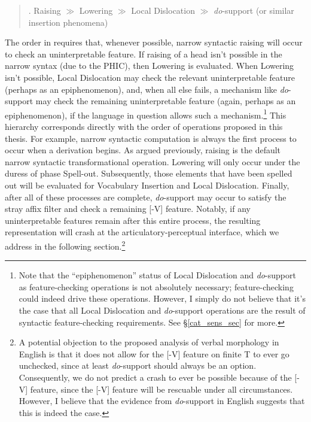 \singlespacing
\begin{quote}
\ex. Raising $\gg$ Lowering $\gg$ Local Dislocation $\gg$ {\it do}-support (or similar insertion phenomena)

\end{quote}
\onehalfspacing
The order in \Last requires that, whenever possible, narrow syntactic raising will occur to check an uninterpretable feature. If raising of a head isn't possible in the narrow syntax (due to the PHIC), then Lowering is evaluated. When Lowering isn't possible, Local Dislocation may check the relevant uninterpretable feature (perhaps as an epiphenomenon), and, when all else fails, a mechanism like {\it do}-support may check the remaining uninterpretable feature (again, perhaps as an epiphenomenon), if the language in question allows such a mechanism.\footnote{Note that the ``epiphenomenon'' status of Local Dislocation and {\it do}-support as feature-checking operations is not absolutely necessary; feature-checking could indeed drive these operations. However, I simply do not believe that it's the case that all Local Dislocation and {\it do}-support operations are the result of syntactic feature-checking requirements. See \S\ref{cat_sens_sec} for more.} This hierarchy corresponds directly with the order of operations proposed in this thesis. For example, narrow syntactic computation is always the first process to occur when a derivation begins. As argued previously, raising is the default narrow syntactic transformational operation. Lowering will only occur under the duress of phase Spell-out. Subsequently, those elements that have been spelled out will be evaluated for Vocabulary Insertion and Local Dislocation. Finally, after all of these processes are complete, {\it do}-support may occur to satisfy the stray affix filter and check a remaining [-V] feature. Notably, if any uninterpretable features remain after this entire process, the resulting representation will crash at the articulatory-perceptual interface, which we address in the following section.\footnote{A potential objection to the proposed analysis of verbal morphology in English is that it does not allow for the [-V] feature on finite T to ever go unchecked, since at least {\it do}-support should always be an option. Consequently, we do not predict a crash to ever be possible because of the [-V] feature, since the [-V] feature will be rescuable under all circumstances. However, I believe that the evidence from {\it do}-support in English suggests that this is indeed the case.}

